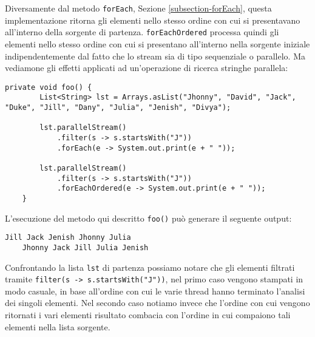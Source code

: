 			Diversamente dal metodo \lstinline|forEach|, Sezione \ref{subsection-forEach}, questa implementazione ritorna gli elementi nello stesso ordine con cui si presentavano all'interno della sorgente di partenza. \lstinline|forEachOrdered| processa quindi gli elementi nello stesso ordine con cui si presentano all'interno nella sorgente iniziale indipendentemente dal fatto che lo stream sia di tipo sequenziale o parallelo. Ma vediamone gli effetti applicati ad un'operazione di ricerca stringhe parallela:
			\begin{lstlisting}[breaklines=true]
	private void foo() {
		List<String> lst = Arrays.asList("Jhonny", "David", "Jack", "Duke", "Jill", "Dany", "Julia", "Jenish", "Divya");
			
		lst.parallelStream()
			.filter(s -> s.startsWith("J"))
			.forEach(e -> System.out.print(e + " "));
		
		lst.parallelStream()
			.filter(s -> s.startsWith("J"))
			.forEachOrdered(e -> System.out.print(e + " "));
	}
			\end{lstlisting}
			L'esecuzione del metodo qui descritto \lstinline|foo()| può generare il seguente output:
			\begin{lstlisting}[numbers=none,frame=none]
	Jill Jack Jenish Jhonny Julia 
	Jhonny Jack Jill Julia Jenish 
			\end{lstlisting}
			Confrontando la lista \lstinline|lst| di partenza possiamo notare che gli elementi filtrati tramite \lstinline|filter(s -> s.startsWith("J"))|, nel primo caso vengono stampati in modo casuale, in base all'ordine con cui le varie thread hanno terminato l'analisi dei singoli elementi. Nel secondo caso notiamo invece che l'ordine con cui vengono ritornati i vari elementi risultato combacia con l'ordine in cui compaiono tali elementi nella lista sorgente. 
			
